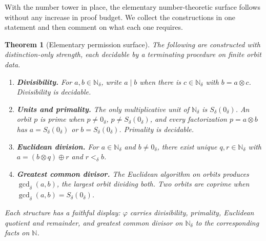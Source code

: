 \documentclass[11pt,a4paper]{article}
\newtheorem{theorem}{Theorem}[section]
\theoremstyle{definition}
\theoremstyle{remark}
\newcommand{\Nd}{\mathbb{N}_\delta}
\newcommand{\Sd}{S_\delta}
\newcommand{\zd}{0_\delta}
\newcommand{\oad}{\oplus}
\newcommand{\omd}{\otimes}
\begin{document}
With the number tower in place, the elementary number-theoretic surface follows
without any increase in proof budget. We collect the constructions in one
statement and then comment on what each one requires.

\begin{theorem}[Elementary permission surface]\label{thm:permission}
The following are constructed with distinction-only strength, each decidable by
a terminating procedure on finite orbit data.
\begin{enumerate}[leftmargin=2em, label=\textup{(\alph*)}]
  \item \textbf{Divisibility.} For $a, b \in \Nd$, write $a \mid b$ when there
    is $c \in \Nd$ with $b = a \omd c$. Divisibility is decidable.
  \item \textbf{Units and primality.} The only multiplicative unit of $\Nd$ is
    $\Sd(\zd)$. An orbit $p$ is \emph{prime} when $p \neq \zd$,
    $p \neq \Sd(\zd)$, and every factorization $p = a \omd b$ has
    $a = \Sd(\zd)$ or $b = \Sd(\zd)$. Primality is decidable.
  \item \textbf{Euclidean division.} For $a \in \Nd$ and $b \neq \zd$, there
    exist unique $q, r \in \Nd$ with $a = (b \omd q) \oad r$ and
    $r <_\delta b$.
  \item \textbf{Greatest common divisor.} The Euclidean algorithm on orbits
    produces $\gcd_\delta(a, b)$, the largest orbit dividing both. Two orbits
    are \emph{coprime} when $\gcd_\delta(a, b) = \Sd(\zd)$.
\end{enumerate}
Each structure has a faithful display: $\varphi$ carries divisibility,
primality, Euclidean quotient and remainder, and greatest common divisor on
$\Nd$ to the corresponding facts on $\mathbb{N}$.
\end{theorem}
\end{document}

